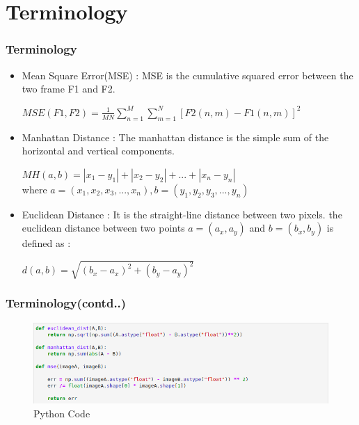 \documentclass{beamer}
\begin{document}
\section{Terminology} \label{Terminology}
\begin{frame}
\frametitle{Terminology}
	\begin{itemize}
		\item Mean Square Error(MSE) : MSE is the cumulative squared error between the two frame F1 and F2.
		\begin{center}
			$MSE(F1,F2) = \frac{1}{MN}\sum_{n=1}^{M}\sum_{m=1}^{N}[F2(n,m)-F1(n,m)]^2$
		\end{center}
		\item Manhattan Distance : The manhattan distance is the simple sum of the
		horizontal and vertical components.
		\begin{center}
			$MH(a,b) = |x_1-y_1|+|x_2-y_2|+...+|x_n-y_n|$
			\\where $a = (x_1,x_2,x_3,...,x_n) , b=(y_1,y_2,y_3,...,y_n)$
		\end{center}
		\item Euclidean Distance : It is the straight-line distance between two pixels.  the euclidean distance
		between two points $a = (a_x, a_y)$ and $b = (b_x, b_y)$ is defined as :
		\begin{center}
			$d(a,b) = \sqrt{(b_x-a_x)^2+(b_y-a_y)^2}$
		\end{center}
	\end{itemize}
\end{frame}
\begin{frame}
\frametitle{Terminology(contd..)}
\begin{figure}
	\includegraphics[width=0.9\linewidth, height=0.4\textheight]{Presentation_Image/code}
	\caption{Python Code}
	\label{fig:code}
\end{figure}
	
\end{frame}
\end{document}
